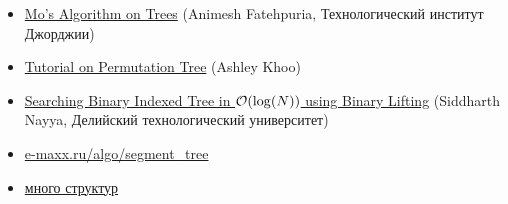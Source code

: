\begin{itemize}
	\item \href{https://codeforces.com/blog/entry/43230}{Mo's Algorithm on Trees} (Animesh Fatehpuria, Технологический институт Джорджии)
	
	\item \href{https://codeforces.com/blog/entry/78898}{Tutorial on Permutation Tree} (Ashley Khoo)
	
	\item \href{https://codeforces.com/blog/entry/61364}{Searching Binary Indexed Tree in $ \mathcal{O}( \log(N))$ using Binary Lifting} (Siddharth Nayya, Делийский технологический университет)
	
	\item \href{https://e-maxx.ru/algo/segment_tree}{e-maxx.ru/algo/segment\_tree}
	
	\item \href{https://codeforces.com/blog/entry/15729}{много структур}
	
	
\end{itemize}



